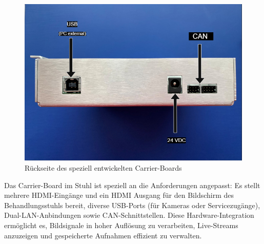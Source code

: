 \begin{figure}[H]
  \centering
  \begin{minipage}[b]{0.82\textwidth}
    \centering
    \includegraphics[width=\textwidth]{images/canfixed.drawio.png}
  \end{minipage}
  \hspace{0.05\textwidth}
  \caption{Rückseite des speziell entwickelten Carrier-Boards}
  \label{fig:CarrierBoardRueckseite}
\end{figure}
\vspace{1em}

Das Carrier-Board im Stuhl ist speziell an die Anforderungen angepasst: Es stellt mehrere HDMI-Eingänge und ein HDMI Ausgang für den Bildschirm des Behandlungsstuhls bereit, diverse USB-Ports (für Kameras oder Servicezugänge), Dual-LAN-Anbindungen sowie CAN-Schnittstellen. Diese Hardware-Integration ermöglicht es, Bildsignale in hoher Auflösung zu verarbeiten, Live-Streams anzuzeigen und gespeicherte Aufnahmen effizient zu verwalten.

